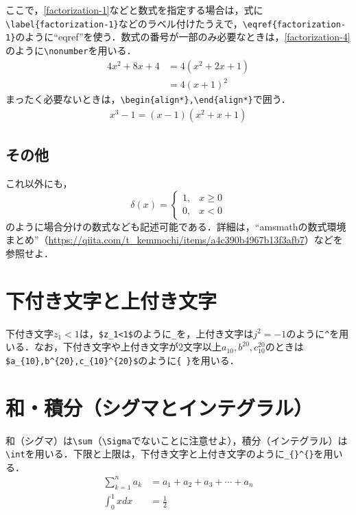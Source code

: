 \documentclass[11pt,a4paper]{jsarticle}
\begin{document}
ここで，\eqref{factorization-1}などと数式を指定する場合は，式に\verb|\label{factorization-1}|などのラベル付けたうえで，\verb|\eqref{factorization-1}|のように``eqref''を使う．数式の番号が一部のみ必要なときは，\eqref{factorization-4}のように\verb|\nonumber|を用いる．
\begin{align}\label{factorization-4}
  4x^2+8x+4 & =4\left(x^2+2x+1\right)\nonumber \\
            & =4(x+1)^2
\end{align}
まったく必要ないときは，\verb|\begin{align*},\end{align*}|で囲う．
\begin{align*}
  x^3-1=(x-1)\left(x^2+x+1\right)
\end{align*}

\subsection{その他}

これ以外にも，
\begin{equation*}
  \delta(x) =
  \begin{cases}
    1, & x \geq 0 \\
    0, & x < 0
  \end{cases}
\end{equation*}
のように場合分けの数式なども記述可能である．詳細は，``amsmathの数式環境まとめ''（\url{https://qiita.com/t_kemmochi/items/a4c390b4967b13f3afb7}）などを参照せよ．

\section{下付き文字と上付き文字}

下付き文字$z_1<1$は，\verb|$z_1<1$|のように\verb|_|を，上付き文字は$j^2=-1$のように\verb|^|を用いる．なお，下付き文字や上付き文字が2文字以上$a_{10},b^{20},c_{10}^{20}$のときは\verb|$a_{10},b^{20},c_{10}^{20}$|のように\verb|{ }|を用いる．

\section{和・積分（シグマとインテグラル）}

和（シグマ）は\verb|\sum|（\verb|\Sigma|でないことに注意せよ），積分（インテグラル）は\verb|\int|を用いる．下限と上限は，下付き文字と上付き文字のように\verb|_{}^{}|を用いる．
\begin{align*}
  \sum_{k=1}^{n}a_k & =a_1+a_2+a_3+\cdots+a_n \\
  \int_0^1 x dx     & = \frac{1}{2}
\end{align*}
\end{document}
